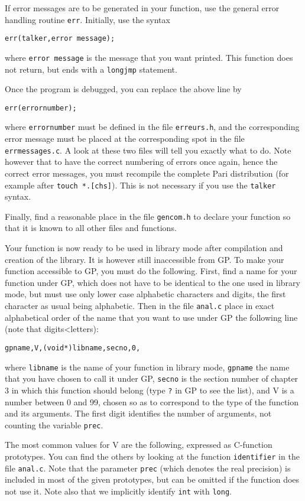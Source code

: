 If error messages are to be generated in your function, use the general
error handling routine {\tt err}. Initially, use the syntax

{\tt err(talker,\quo error message\quo);}

where {\tt error message} is the message that you want printed. This function
does not return, but ends with a {\tt longjmp} statement.

Once the program is debugged, you can replace the above line by

{\tt err(errornumber);} 

where {\tt errornumber} must be defined in the file {\tt erreurs.h}, and the
corresponding error message must be placed at the corresponding spot
in the file {\tt errmessages.c}. A look at these two files will tell you
exactly what to do. Note however that to have the correct numbering of errors
once again, hence the correct error messages, you must recompile the
complete Pari distribution (for example after {\tt touch *.[chs]}). This is
not necessary if you use the {\tt talker} syntax.

Finally, find a reasonable place in the file {\tt gencom.h} to declare your
function so that it is known to all other files and functions.

Your function is now ready to be used in library mode after compilation and
creation of the library. It is however still inaccessible from GP.
\smallskip
To make your function accessible to GP, you must do the following. First, find
a name for your function under GP, which does not have to be identical to the
one used in library mode, but must use only lower case alphabetic characters
and digits, the first character as usual being alphabetic. Then in the file
{\tt anal.c} place in exact alphabetical order of the name that you want
to use under GP the following line (note that digits<letters):

{\tt \obr\quo gpname\quo ,V,(void*)libname,secno,0\cbr,}

where {\tt libname} is the name of your function in library mode, {\tt gpname}
the name that you have chosen to call it under GP, {\tt secno} is the section
number of chapter 3 in which this function should belong (type {\tt ?} in GP
to see the list), and V is a number between
0 and 99, chosen so as to correspond to the type of the function and its 
arguments. The first digit identifies the number of arguments, not counting
the variable {\tt prec}.

The most common values for V are the following, expressed as C-function
prototypes. You can find the others by looking at the function {\tt identifier}
in the file {\tt anal.c}. Note that the parameter {\tt prec} (which denotes the
real precision) is included in most of the given prototypes, but can be omitted
if the function does not use it. Note also that we implicitly identify 
{\tt int} with {\tt long}.

